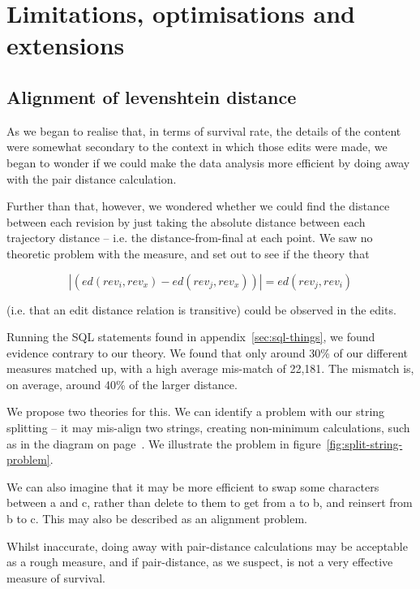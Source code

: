 \section{Limitations, optimisations and extensions}
\subsection*{Alignment of levenshtein distance}
\label{split-distance-eval}
As we began to realise that, in terms of survival rate, the details of
the content were somewhat secondary to the context in which those
edits were made, we began to wonder if we could make the data analysis
more efficient by doing away with the pair distance calculation.

Further than that, however, we wondered whether we could find the
distance between each revision by just taking the absolute distance
between each trajectory distance -- i.e. the distance-from-final at
each point. We saw no theoretic problem with the measure, and set out
to see if the theory that

\[
  |(ed(rev_i,rev_x) - ed(rev_j,rev_x))| = ed(rev_j,rev_i)
\]

(i.e. that an edit distance relation is transitive) could be observed
in the edits. 

Running the SQL statements found in appendix~\ref{sec:sql-things}, we
found evidence contrary to our theory. We found that only around 30\%
of our different measures matched up, with a high average mis-match of
22,181. The mismatch is, on average, around 40\% of the larger
distance.

We propose two theories for this. We can identify a problem with our
string splitting -- it may mis-align two strings, creating non-minimum
calculations, such as in the diagram on page~\pageref{fig:sub-opt}. We
illustrate the problem in figure~\ref{fig:split-string-problem}.

We can also imagine that it may be more efficient to swap some
characters between a and c, rather than delete to them to get from a
to b, and reinsert from b to c. This may also be described as an
alignment problem.

Whilst inaccurate, doing away with pair-distance calculations may be
acceptable as a rough measure, and if pair-distance, as we suspect, is
not a very effective measure of survival.

